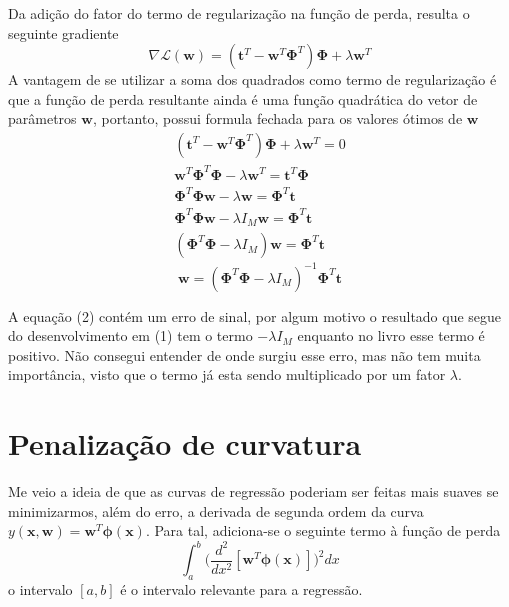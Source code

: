 \documentclass{article}
\begin{document}
Da adição do fator do termo de regularização na função de perda, resulta o seguinte gradiente
\[
\nabla \mathcal{L}(\textbf{w}) = (\textbf{t}^T - \textbf{w}^T \boldsymbol{\Phi}^T) \boldsymbol{\Phi} + \lambda \textbf{w}^T
\]
A vantagem de se utilizar a soma dos quadrados como termo de regularização é que a função de perda resultante
ainda é uma função quadrática do vetor de parâmetros \( \textbf{w} \), portanto, possui formula fechada para
os valores ótimos de \( \textbf{w} \)
\begin{gather}
\nonumber
(\textbf{t}^T - \textbf{w}^T \boldsymbol{\Phi}^T) \boldsymbol{\Phi} + \lambda \textbf{w}^T = 0              \\ \nonumber
\textbf{w}^T \boldsymbol{\Phi}^T \boldsymbol{\Phi} - \lambda \textbf{w}^T = \textbf{t}^T \boldsymbol{\Phi}  \\
\boldsymbol{\Phi}^T \boldsymbol{\Phi} \textbf{w} - \lambda \textbf{w} = \boldsymbol{\Phi}^T \textbf{t}      \\ \nonumber
\boldsymbol{\Phi}^T \boldsymbol{\Phi} \textbf{w} - \lambda I_M \textbf{w} = \boldsymbol{\Phi}^T \textbf{t}  \\ \nonumber
(\boldsymbol{\Phi}^T \boldsymbol{\Phi} - \lambda I_M) \textbf{w} = \boldsymbol{\Phi}^T \textbf{t}
\end{gather}
\begin{equation}
\textbf{w} = (\boldsymbol{\Phi}^T \boldsymbol{\Phi} - \lambda I_M)^{-1} \boldsymbol{\Phi}^T \textbf{t}
\end{equation}

A equação (2) contém um erro de sinal, por algum motivo o resultado que segue do desenvolvimento em (1) tem o termo
\( - \lambda I_M \) enquanto no livro esse termo é positivo. Não consegui entender de onde surgiu esse erro, mas não tem muita
importância, visto que o termo já esta sendo multiplicado por um fator \( \lambda \).

\section{Penalização de curvatura}

Me veio a ideia de que as curvas de regressão poderiam ser feitas mais suaves se minimizarmos, além do erro, a derivada
de segunda ordem da curva \( y(\textbf{x}, \textbf{w}) = \textbf{w}^T \boldsymbol{\phi}(\textbf{x}) \). Para tal, adiciona-se
o seguinte termo à função de perda
\begin{equation}
\int_{a}^{b} \bigg( \frac{d^2}{dx^2} [ \textbf{w}^T \boldsymbol{\phi}(\textbf{x}) ] \bigg)^2 dx
\end{equation}
o intervalo \( [a, b] \) é o intervalo relevante para a regressão.
\end{document}
